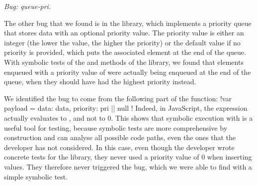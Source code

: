 \smallskip
\noindent \emph{Bug: queue-pri.}

The other bug that we found is in the  library, which implements a priority queue that stores data with an optional priority value.
The priority value is either an integer (the lower the value, the higher the priority) or the default  value if no priority is provided, which puts the associated element at the end of the queue.
With symbolic tests of the  and  methods of the library, we found that elements enqueued with a priority value of  were actually being enqueued at the end of the queue, when they should have had the highest priority instead.

We identified the bug to come from the following part of the  function: \jsinline!var payload = { data: data, priority: pri || null }!
Indeed, in JavaScript, the expression  actually evaluates to , and not to 0.
This shows that symbolic execution with \cosette is a useful tool for testing, because symbolic tests are more comprehensive by construction and can analyse all possible code paths, even the ones that the developer has not considered.
In this case, even though the developer wrote concrete tests for the library, they never used a priority value of 0 when inserting values.
They therefore never triggered the bug, which we were able to find with a simple symbolic test.

